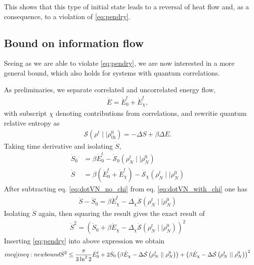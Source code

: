 \documentclass[a4paper,11pt]{scrartcl}
\begin{document}
This shows that this type of initial state leads to a reversal of heat flow and, as a consequence, to a violation of \cref{eq:pendry}.
\subsection{Bound on information flow}
Seeing as we are able to violate \cref{eq:pendry}, we are now interested in a more general bound, which also holds for systems
with quantum correlations.

As preliminaries, we separate correlated and uncorrelated energy flow,
\begin{align}
    \dot{E} = \dot{E}_0^t + \dot{E}_\chi^t,
\end{align}
with subscript $\chi$ denoting contributions from correlations,
and rewritie quantum relative entropy as
\begin{align}
    \mathcal{S}(\rho^t\mid\mid\rho^0_\text{th}) = - \Delta S + \beta \Delta E.
\end{align}
Taking time derivative and isolating $\dot{S}$,
\begin{align}
    \dot{S}_0 &= \beta \dot{E}_0^t- \dot{\mathcal{S}}_0(\rho^t_N \mid \mid \rho^0_N)\label{eq:dotVN_no_chi}\\
    \dot{S} &= \beta \left(\dot{E}_0^t + \dot{E}_\chi^t\right)
    - \dot{\mathcal{S}}_\chi(\rho^t_N \mid \mid \rho^0_N)\label{eq:dotVN_with_chi}
\end{align}
After subtracting eq. \eqref{eq:dotVN_no_chi} from eq. \eqref{eq:dotVN_with_chi} one has
\begin{align}
    \dot{S} - \dot{S}_0 = \beta \dot{E}_\chi^t - \Delta_\chi \dot{\mathcal{S}}(\rho^t_N \mid \mid \rho^0_N)
\end{align}
Isolating $\dot{S}$ again, then squaring the result gives the exact result of
\begin{align}
    \dot{S}^2 = \left(\dot{S}_0 + \beta \dot{E}_\chi - \Delta_\chi \dot{\mathcal{S}}\left(\rho^t_N \mid \mid \rho^0_N\right)\right)^2
\end{align}
Inserting \cref{eq:pendry} into above expression we obtain
\begin{equation}\label[ineq]{ineq:newbound}
    \dot{S}^2 \leq \frac{\pi}{3\ln^22} \dot{E}^t_0 + 2\dot{S}_0\left(\beta \dot{E}_\chi - \Delta \dot{\mathcal{S}}\left(\rho^t_N \mid \mid \rho^0_N\right)\right) + \left(\beta \dot{E}_\chi - \Delta \dot{\mathcal{S}}\left(\rho^t_N \mid \mid \rho^0_N\right)\right)^2
\end{equation}
\end{document}
